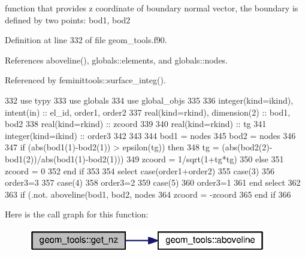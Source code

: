 function that provides z coordinate of boundary normal vector, the boundary is defined by two points\+: bod1, bod2 



Definition at line 332 of file geom\+\_\+tools.\+f90.



References aboveline(), globals\+::elements, and globals\+::nodes.



Referenced by feminittools\+::surface\+\_\+integ().


\begin{DoxyCode}
332     \textcolor{keywordtype}{use }typy
333     \textcolor{keywordtype}{use }globals
334     \textcolor{keywordtype}{use }global_objs
335 
336     \textcolor{keywordtype}{integer(kind=ikind)}, \textcolor{keywordtype}{intent(in)} :: el\_id, order1, order2
337     \textcolor{keywordtype}{real(kind=rkind)}, \textcolor{keywordtype}{dimension(2)} :: bod1, bod2
338     \textcolor{keywordtype}{real(kind=rkind)} :: zcoord
339 
340     \textcolor{keywordtype}{real(kind=rkind)} :: tg
341     \textcolor{keywordtype}{integer(kind=ikind)} :: order3
342 
343 
344     bod1 = nodes%
345     bod2 = nodes%
346 
347     \textcolor{keywordflow}{if} (abs(bod1(1)-bod2(1)) > epsilon(tg)) \textcolor{keywordflow}{then}
348       tg = (abs(bod2(2)-bod1(2))/abs(bod1(1)-bod2(1)))
349       zcoord = 1/sqrt(1+tg*tg)
350     \textcolor{keywordflow}{else}
351       zcoord = 0
352 \textcolor{keywordflow}{    end if}
353 
354     \textcolor{keywordflow}{select case}(order1+order2)
355       \textcolor{keywordflow}{case}(3)
356         order3=3
357       \textcolor{keywordflow}{case}(4)
358         order3=2
359       \textcolor{keywordflow}{case}(5)
360         order3=1
361 \textcolor{keywordflow}{    end select}
362 
363     \textcolor{keywordflow}{if} (.not. aboveline(bod1, bod2, nodes%
364       zcoord = -zcoord
365 \textcolor{keywordflow}{    end if}
366 
\end{DoxyCode}


Here is the call graph for this function\+:\nopagebreak
\begin{figure}[H]
\begin{center}
\leavevmode
\includegraphics[width=296pt]{namespacegeom__tools_a1237d1dc8b45bd650de0daff46162d6b_cgraph}
\end{center}
\end{figure}




